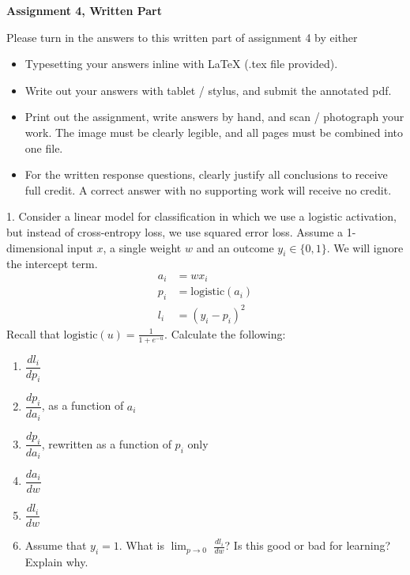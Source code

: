 \documentclass{article}
\begin{document}
\newpage
\begin{center}
  \bfseries\large
  Assignment 4, Written Part
\end{center}

\noindent

\vspace{20mm}

Please turn in the answers to this written part of assignment 4 by either 
 \begin{itemize}
     \item Typesetting your answers inline with LaTeX (.tex file provided).
     \item Write out your answers with tablet / stylus, and submit the annotated pdf.
     \item Print out the assignment, write answers by hand, and scan / photograph your work.  The image must be clearly legible, and all pages must be combined into one file.
     \item For the written response questions, clearly justify all conclusions to receive full credit. A correct answer with no supporting work will receive no credit.
 \end{itemize}

\newpage

1. Consider a linear model for classification in which we use a logistic activation, but instead of cross-entropy loss, we use squared error loss. Assume a 1-dimensional input $x$, a single weight $w$ and an outcome $y_i\in\{0,1\}$. We will ignore the intercept term.
\begin{align*}
a_i &= wx_i \\
p_{i}&=\mbox{logistic}\left(a_i\right) \\
l_{i}&=\left(y_i-p_{i}\right)^{2}
\end{align*}
Recall that $\mbox{logistic}\left(u\right)=\frac{1}{1+e^{-u}}$.
Calculate the following:

{
\renewcommand{\theenumi}{\alph{enumi}}
\begin{enumerate}
\item  $\dfrac{dl_i}{dp_i}$ \\
\item $\dfrac{dp_i}{da_i}$, as a function of $a_i$ \\
\item $\dfrac{dp_i}{da_i}$, rewritten as a function of $p_i$ only \\
\item $\dfrac{da_i}{dw}$ \\
\item $\dfrac{dl_i}{dw}$ \\
\item Assume that $y_i = 1$. What is $\lim_{p\rightarrow0}$ $\frac{dl_i}{dw}$? Is this good or bad for learning? Explain why.
\end{enumerate}
}
\end{document}

